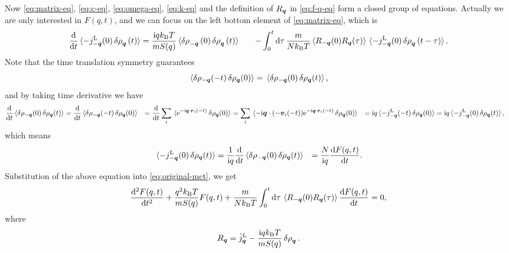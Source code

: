 \documentclass[hyperref, a4paper]{article}
\newcommand*{\ii}{\mathrm{i}}
\newcommand*{\ee}{\mathrm{e}}
\def\\{}%
\begin{document}
Now \eqref{eq:matrix-eq}, \eqref{eq:c-eq}, \eqref{eq:omega-eq}, \eqref{eq:k-eq} and the definition of $R_{\vb*{q}}$ 
in \eqref{eq:f-q-eq} form a closed group of equations. Actually we are only interested in $F(q, t)$,
and we can focus on the left bottom element of \eqref{eq:matrix-eq}, which is 
\begin{equation}
    \begin{aligned}
        \dv{t} \expval*{ - j^\text{L}_{-\vb*{q}}(0) \var{\rho}_{\vb*{q}}(t) } 
        &= \frac{\ii q k_\text{B} T}{m S(q)} \expval*{ \var{\rho}_{-\vb*{q}}(0) \var{\rho}_{\vb*{q}}(t) } \\
        &\quad - \int_0^t \dd{\tau} \frac{m}{N k_\text{B} T} \expval*{R_{-\vb*{q}}(0) R_{\vb*{q}}(\tau)} \expval*{ - j^\text{L}_{-\vb*{q}}(0) \var{\rho}_{\vb*{q}}(t - \tau) } .
    \end{aligned}
    \label{eq:original-mct}
\end{equation}
Note that the time translation symmetry guarantees
\[
    \expval*{\var{\rho_{-\vb*{q}}(-t)} \var{\rho_{\vb*{q}}(0)}} = \expval*{\var{\rho_{-\vb*{q}}(0)} \var{\rho_{\vb*{q}}(t)}},
\]
and by taking time derivative we have 
\[
    \begin{aligned}
        \dv{t} \expval*{\var{\rho_{-\vb*{q}}(0)} \var{\rho_{\vb*{q}}(t)}} &= 
        \dv{t} \expval*{\var{\rho_{-\vb*{q}}(-t)} \var{\rho_{\vb*{q}}(0)}} \\
        &= \dv{t} \sum_i \expval*{\ee^{- \ii \vb*{q} \cdot \vb*{r}_i (-t)} \var{\rho_{\vb*{q}}(0)}}  \\
        &= \sum_i \expval*{ - \ii \vb*{q} \cdot (- \vb*{v}_i(-t)) \ee^{- \ii \vb*{q} \cdot \vb*{r}_i (-t)} \var{\rho_{\vb*{q}}(0)}}  \\
        &= \ii q \expval*{- j^\text{L}_{-\vb*{q}}(-t) \var{\rho_{\vb*{q}}(0)}} \\
        &= \ii q \expval*{- j^\text{L}_{-\vb*{q}}(0) \var{\rho_{\vb*{q}}(t)}},
    \end{aligned}
\]
which means 
\[
    \begin{aligned}
        \expval*{- j^\text{L}_{-\vb*{q}}(0) \var{\rho_{\vb*{q}}(t)}} 
        &= \frac{1}{\ii q} \dv{t} \expval*{\var{\rho_{-\vb*{q}}(0)} \var{\rho_{\vb*{q}}(t)}} \\
        &= \frac{N}{\ii q} \dv{F(q, t)}{t} .
    \end{aligned}
\]
Substitution of the above equation into \eqref{eq:original-mct}, we get 
\begin{equation}
    \dv[2]{F(q, t)}{t} + \frac{q^2 k_\text{B} T}{m S(q)} F(q, t) + \frac{m}{N k_\text{B} T} \int_0^t \dd{\tau} \expval*{R_{-\vb*{q}}(0) R_{\vb*{q}}(\tau)} \dv{F(q, t)}{t} = 0,
    \label{eq:exact-mct}
\end{equation}
where 
\begin{equation}
    R_{\vb*{q}} = \dot{j}_{\vb*{q}}^\text{L} - \frac{\ii q k_\text{B} T}{m S(q)} \var{\rho}_{\vb*{q}}.
    \label{eq:r-def}
\end{equation}
\end{document}
